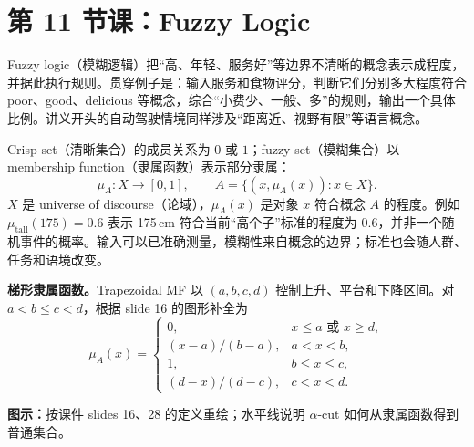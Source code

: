 \begingroup
\setlength{\parskip}{0.45em}
\renewcommand{\recordid}[1]{}
\renewcommand{\relatedexercise}[2]{\hyperref[exercise:#1]{#2}}

\section{第 11 节课：Fuzzy Logic}
\label{lecture:SC3000-L11}


Fuzzy logic（模糊逻辑）把“高、年轻、服务好”等边界不清晰的概念表示成程度，并据此执行规则。贯穿例子是：输入服务和食物评分，判断它们分别多大程度符合 poor、good、delicious 等概念，综合“小费少、一般、多”的规则，输出一个具体比例。讲义开头的自动驾驶情境同样涉及“距离近、视野有限”等语言概念。


Crisp set（清晰集合）的成员关系为 $0$ 或 $1$；fuzzy set（模糊集合）以 membership function（隶属函数）表示部分隶属：
\[
 \mu_A:X\longrightarrow[0,1],\qquad
 A=\{(x,\mu_A(x)):x\in X\}.
\]
$X$ 是 universe of discourse（论域），$\mu_A(x)$ 是对象 $x$ 符合概念 $A$ 的程度。例如 $\mu_{\text{tall}}(175)=0.6$ 表示 175\,cm 符合当前“高个子”标准的程度为 $0.6$，并非一个随机事件的概率。输入可以已准确测量，模糊性来自概念的边界；标准也会随人群、任务和语境改变。

\textbf{梯形隶属函数。}Trapezoidal MF 以 $(a,b,c,d)$ 控制上升、平台和下降区间。对 $a<b\le c<d$，根据 slide 16 的图形补全为
\[
 \mu_A(x)=
 \begin{cases}
  0,&x\le a\text{ 或 }x\ge d,\\
  (x-a)/(b-a),&a<x<b,\\
  1,&b\le x\le c,\\
  (d-x)/(d-c),&c<x<d.
 \end{cases}
\]
\begin{center}

\end{center}
\textbf{图示：}按课件 slides 16、28 的定义重绘；水平线说明 $\alpha$-cut 如何从隶属函数得到普通集合。

